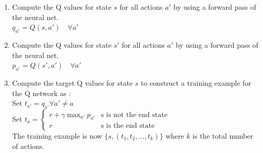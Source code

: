 \documentclass{article}
\begin{document}
\begin{enumerate}
	\item Compute the Q values for state $s$ for all actions $a'$ by using a forward pass of the neural net.\\$q_{a'} = Q(s, a') \quad \forall a'$\\
	\item Compute the Q values for state $s'$ for all actions $a'$ by using a forward pass of the neural net.\\$p_{a'} = Q(s', a') \quad \forall a'$\\
	\item Compute the target Q values for state $s$ to construct a training example for the Q network as :\\
	Set $t_{a'} = q_{a'} \forall a' \neq a$\\Set $ t_{a} = \begin{cases} r + \gamma \max_{a'}p_{a'} & \text{s is not the end state}\\ r & \text{s is the end state}        \end{cases}$\\ The training example is now $\{s, (t_1, t_2, ..., t_k)\}$ where $k$ is the total number of actions.
\end{enumerate}
\end{document}
